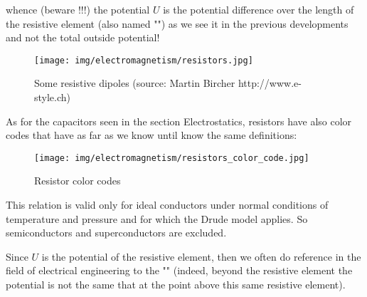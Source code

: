 	whence (beware !!!) the potential $U$ is the potential difference over the length of the resistive element (also named "") as we see it in the previous developments and not the total outside potential!
	\begin{figure}[H]
		\centering
		\texttt{[image: img/electromagnetism/resistors.jpg]}
		\caption[Some resistive dipoles]{Some resistive dipoles (source: Martin Bircher http://www.e-style.ch)}
	\end{figure}
	As for the capacitors seen in the section Electrostatics, resistors have also color codes that have as far as we know until know the same definitions:
	\begin{figure}[H]
		\centering
		\texttt{[image: img/electromagnetism/resistors\_color\_code.jpg]}
		\caption{Resistor color codes}
	\end{figure}
	\begin{tcolorbox}[title=Remark,colframe=black,arc=10pt]
	This relation is valid only for ideal conductors under normal conditions of temperature and pressure and for which the Drude model applies. So semiconductors and superconductors are excluded.
	\end{tcolorbox}
	Since $U$ is the potential of the resistive element, then we often do reference in the field of electrical engineering to the "" (indeed, beyond the resistive element the potential is not the same that at the point above this same resistive element).
	
